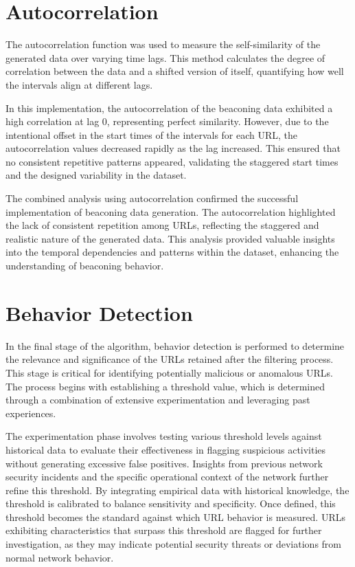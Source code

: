 \section{Autocorrelation}
The autocorrelation function was used to measure the self-similarity of the generated data over varying time lags. This method calculates the degree of correlation between the data and a shifted version of itself, quantifying how well the intervals align at different lags.

In this implementation, the autocorrelation of the beaconing data exhibited a high correlation at lag 0, representing perfect similarity. However, due to the intentional offset in the start times of the intervals for each URL, the autocorrelation values decreased rapidly as the lag increased. This ensured that no consistent repetitive patterns appeared, validating the staggered start times and the designed variability in the dataset.

The combined analysis using autocorrelation confirmed the successful implementation of beaconing data generation. The autocorrelation highlighted the lack of consistent repetition among URLs, reflecting the staggered and realistic nature of the generated data. This analysis provided valuable insights into the temporal dependencies and patterns within the dataset, enhancing the understanding of beaconing behavior.

\section{Behavior Detection}
In the final stage of the algorithm, behavior detection is performed to determine the relevance and significance of the URLs retained after the filtering process. This stage is critical for identifying potentially malicious or anomalous URLs. The process begins with establishing a threshold value, which is determined through a combination of extensive experimentation and leveraging past experiences.

The experimentation phase involves testing various threshold levels against historical data to evaluate their effectiveness in flagging suspicious activities without generating excessive false positives. Insights from previous network security incidents and the specific operational context of the network further refine this threshold. By integrating empirical data with historical knowledge, the threshold is calibrated to balance sensitivity and specificity. Once defined, this threshold becomes the standard against which URL behavior is measured. URLs exhibiting characteristics that surpass this threshold are flagged for further investigation, as they may indicate potential security threats or deviations from normal network behavior.

